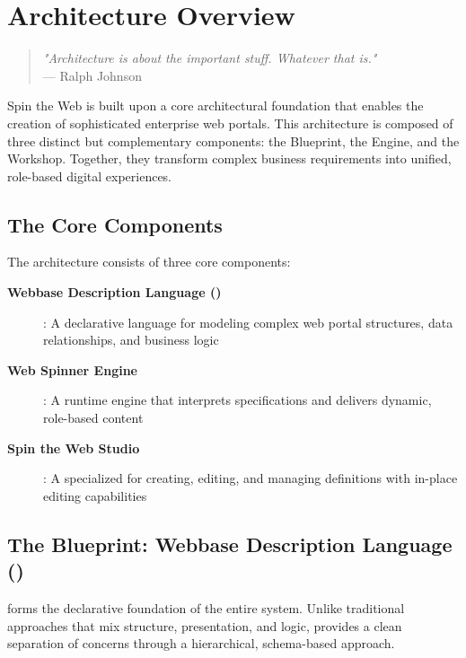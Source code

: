 
\chapter{Architecture Overview}
\label{chap:architecture}

\begin{quote}
\textit{"Architecture is about the important stuff. Whatever that is."} \\
— Ralph Johnson
\end{quote}

Spin the Web is built upon a core architectural foundation that enables the creation of sophisticated enterprise web portals. This architecture is composed of three distinct but complementary components: the Blueprint, the Engine, and the Workshop. Together, they transform complex business requirements into unified, role-based digital experiences.

\section{The Core Components}
\label{sec:core-components}

The architecture consists of three core components:

\begin{description}
\item[\textbf{Webbase Description Language (\wbdl{})}]: A declarative language for modeling complex web portal structures, data relationships, and business logic
\item[\textbf{Web Spinner Engine}]: A runtime engine that interprets \wbdl{} specifications and delivers dynamic, role-based content
\item[\textbf{Spin the Web Studio}]: A specialized \webbaselet{} for creating, editing, and managing \webbase{} definitions with in-place editing capabilities
\end{description}

\section{The Blueprint: Webbase Description Language (\wbdl{})}
\label{sec:blueprint-wbdl}

\wbdl{} forms the declarative foundation of the entire system. Unlike traditional approaches that mix structure, presentation, and logic, \wbdl{} provides a clean separation of concerns through a hierarchical, schema-based approach.

